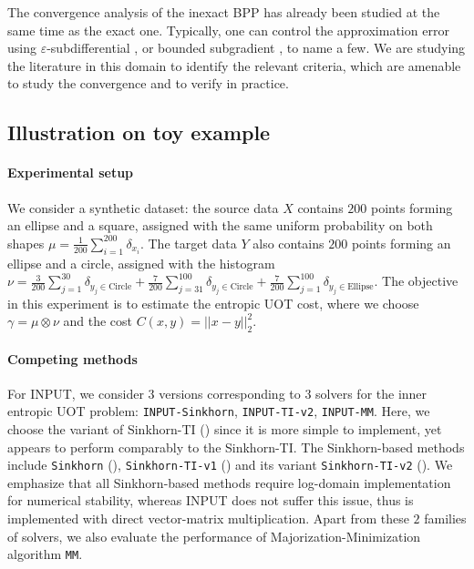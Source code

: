 The convergence analysis of the inexact BPP has already been studied at the same time
as the exact one. Typically, one can control the approximation error using
$\varepsilon$-subdifferential \citep{Burachik97,Kiwiel97},
or bounded subgradient \citep{Eckstein98,Rockafellar76}, to name a few.
We are studying the literature in this domain to identify the relevant criteria, which are
amenable to study the convergence and to verify in practice.

\subsection{Illustration on toy example}

\paragraph{Experimental setup}
We consider a synthetic dataset:
the source data $X$ contains $200$ points forming an ellipse and a square,
assigned with the same uniform probability on both shapes
$\mu = \frac{1}{200} \sum_{i=1}^{200} \delta_{x_i}$. The target data $Y$ also contains $200$ points
forming an ellipse and a circle, assigned with the histogram
$\nu = \frac{3}{200} \sum_{j=1}^{30} \delta_{y_j \in \text{Circle}} +
\frac{7}{200} \sum_{j=31}^{100} \delta_{y_j \in \text{Circle}} +
\frac{7}{200} \sum_{j=1}^{100} \delta_{y_j \in \text{Ellipse}}$.
The objective in this experiment is to estimate the entropic UOT cost, where
we choose $\gamma = \mu \otimes \nu$ and the cost $C(x, y) = || x - y||^2_2$.

\paragraph{Competing methods}
For INPUT, we consider $3$ versions corresponding to $3$ solvers for the inner entropic UOT problem:
\texttt{INPUT-Sinkhorn}, \texttt{INPUT-TI-v2}, \texttt{INPUT-MM}.
Here, we choose the variant of Sinkhorn-TI ()
since it is more simple to implement, yet appears to perform comparably to the Sinkhorn-TI.
The Sinkhorn-based methods include
\texttt{Sinkhorn} (), \texttt{Sinkhorn-TI-v1} ()
and its variant \texttt{Sinkhorn-TI-v2} ().
We emphasize that all Sinkhorn-based methods require log-domain implementation
for numerical stability, whereas INPUT does not suffer this issue,
thus is implemented with direct vector-matrix multiplication.
Apart from these $2$ families of solvers, we also evaluate the performance of
Majorization-Minimization algorithm \texttt{MM}.


